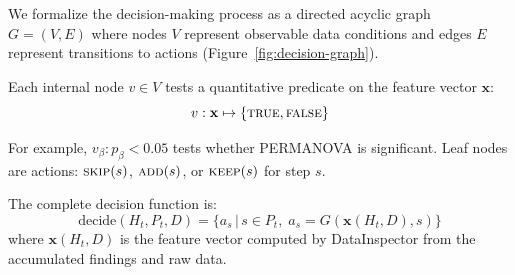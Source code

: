 \documentclass[11pt,a4paper]{article}
\begin{document}
We formalize the decision-making process as a directed acyclic
graph $G = (V, E)$ where nodes $V$ represent observable data
conditions and edges $E$ represent transitions to actions
(Figure~\ref{fig:decision-graph}).

Each internal node $v \in V$ tests a quantitative predicate on the
feature vector $\mathbf{x}$:
\begin{equation}
  v: \mathbf{x} \mapsto \{\textsc{true}, \textsc{false}\}
\end{equation}

For example, $v_\beta: p_\beta < 0.05$ tests whether PERMANOVA is
significant.
Leaf nodes are actions: $\textsc{skip}(s)$, $\textsc{add}(s)$, or
$\textsc{keep}(s)$ for step $s$.

The complete decision function is:
\begin{equation}
  \mathrm{decide}(H_t, P_t, D) =
  \bigl\{
    a_s \,\big|\, s \in P_t,\;
    a_s = G(\mathbf{x}(H_t, D), s)
  \bigr\}
\end{equation}
where $\mathbf{x}(H_t, D)$ is the feature vector computed by
DataInspector from the accumulated findings and raw data.
\end{document}
